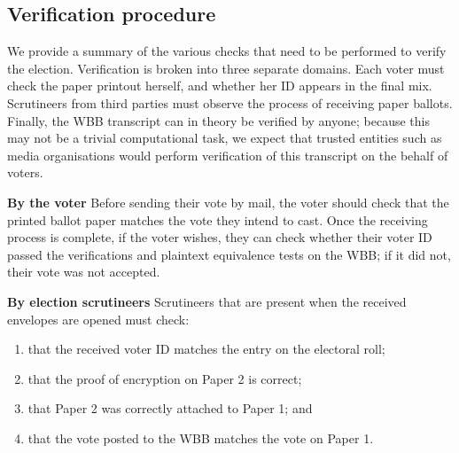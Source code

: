 \documentclass[12pt,a4paper]{article}
\theoremstyle{definition}
\begin{document}
\subsection{Verification procedure}
We provide a summary of the various checks that need to be performed to verify the election. Verification is broken into three separate domains. Each voter must check the paper printout herself, and whether her ID appears in the final mix. Scrutineers from third parties must observe the process of receiving paper ballots. Finally, the WBB transcript can in theory be verified by anyone; because this may not be a trivial computational task, we expect that trusted entities such as media organisations would perform verification of this transcript on the behalf of voters.

\textbf{By the voter}
Before sending their vote by mail, the voter should check that the printed ballot paper matches the vote they intend to cast. Once the receiving process is complete, if the voter wishes, they can check whether their voter ID passed the verifications and plaintext equivalence tests on the WBB; if it did not, their vote was not accepted.

\textbf{By election scrutineers}
Scrutineers that are present when the received envelopes are opened must check:
\begin{enumerate}
	\item that the received voter ID matches the entry on the electoral roll;
	\item that the proof of encryption on Paper 2 is correct;
	\item that Paper 2 was correctly attached to Paper 1; and
	\item that the vote posted to the WBB matches the vote on Paper 1.
\end{enumerate}
\end{document}
